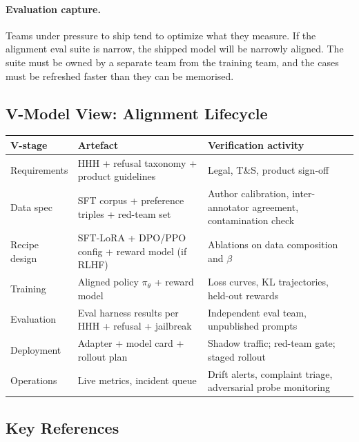 \paragraph{Evaluation capture.}
Teams under pressure to ship tend to optimize what they measure.
If the alignment eval suite is narrow, the shipped model will be
narrowly aligned. The suite must be owned by a separate team from
the training team, and the cases must be refreshed faster than
they can be memorised.

\subsection{V-Model View: Alignment Lifecycle}

\begin{center}
\small
\begin{tabular}{p{4.3cm}|p{4.3cm}|p{4.3cm}}
\textbf{V-stage} & \textbf{Artefact} & \textbf{Verification activity}\\\hline
Requirements & HHH + refusal taxonomy + product guidelines & Legal, T\&S, product sign-off \\
Data spec & SFT corpus + preference triples + red-team set & Author calibration, inter-annotator agreement, contamination check \\
Recipe design & SFT-LoRA + DPO/PPO config + reward model (if RLHF) & Ablations on data composition and $\beta$ \\
Training & Aligned policy $\pi_\theta$ + reward model & Loss curves, KL trajectories, held-out rewards \\
Evaluation & Eval harness results per HHH + refusal + jailbreak & Independent eval team, unpublished prompts \\
Deployment & Adapter + model card + rollout plan & Shadow traffic; red-team gate; staged rollout \\
Operations & Live metrics, incident queue & Drift alerts, complaint triage, adversarial probe monitoring \\
\end{tabular}
\end{center}

\subsection{Key References}

